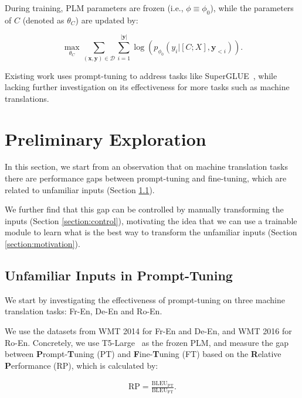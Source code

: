 During training, PLM parameters are frozen (i.e., $\phi\equiv\phi_0$), while the parameters of $\mathit{C}$ (denoted as $\theta_\mathit{C}$) are updated by:

\begin{equation}
\max_{\theta_\mathit{C}}\sum_{(\mathbf{x}, \mathbf{y})\in \mathcal{D}}\sum_{i=1}^{|\mathbf{y}|}{\log}(p_{\phi_0}(y_i|[\mathit{C};\mathit{X}], \mathbf{y}_{< i})).
\label{eq:prompt_tuning}
\end{equation}

Existing work uses prompt-tuning to address tasks like SuperGLUE~\cite{lester2021power}, while lacking further investigation on its effectiveness for more tasks such as machine translations.

\section{Preliminary Exploration}

In this section, we start from an observation that on machine translation tasks there are performance gaps between prompt-tuning and fine-tuning, which are related to unfamiliar inputs (Section \ref{section:unfamiliar}).

We further find that this gap can be controlled by manually transforming the inputs (Section \ref{section:control}), motivating the idea that we can use a trainable module to learn what is the best way to transform the unfamiliar inputs (Section \ref{section:motivation}).

\subsection{Unfamiliar Inputs in Prompt-Tuning}
\label{section:unfamiliar}

We start by investigating the effectiveness of prompt-tuning on three machine translation tasks: Fr-En, De-En and Ro-En.

We use the datasets from WMT 2014 \cite{bojar2014findings} for Fr-En and De-En, and WMT 2016 \cite{bojar2016findings} for Ro-En. Concretely, we use T5-Large~\citep{2020t5} as the frozen PLM, and measure the gap between \textbf{P}rompt-\textbf{T}uning (PT) and \textbf{F}ine-\textbf{T}uning (FT) based on the \textbf{R}elative \textbf{P}erformance (RP), which is calculated by:

\begin{equation}
\begin{split}
    \mathrm{RP} = \frac{\mathrm{BLEU_{PT}}}{\mathrm{BLEU_{FT}}}.
\end{split}
\end{equation}

